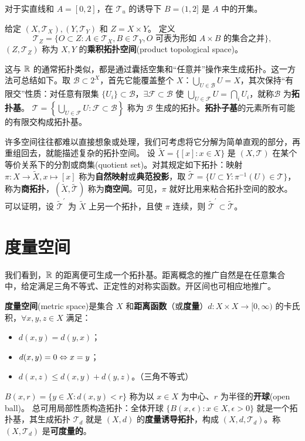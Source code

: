 \begin{eg}
    对于实直线和 $A=[0,2]$，在 $\mathscr T_u$ 的诱导下 $B=(1,2]$ 是 $A$ 中的开集。
\end{eg}

\begin{definition}
    给定 $(X,\mathscr T_X),(Y,\mathscr T_Y)$ 和 $Z=X \times Y$。
    定义
    \[\mathscr T_Z=\{O\subset Z:A\in\mathscr T_X,B\in\mathscr T_Y,\text{$O$ 可表为形如 $A\times B$ 的集合之并}\},\]
    $(Z,\mathscr T_Z)$ 称为 $X,Y$ 的\textbf{乘积拓扑空间}(product topological space)。
\end{definition}

这与 $\mathbb{R}$ 的通常拓扑类似，都是通过囊括空集和“任意并”操作来生成拓扑。这一方法可总结如下。取 $\mathscr{B} \subset 2^X$，首先它能覆盖整个 $X$：$\bigcup_{U\in\mathscr{B}}U=X$，其次保持“有限交”性质：对任意有限集 $\{U_i\}\subset\mathscr{B}$，$\exists\mathscr{F}\subset \mathscr{B}$ 使 $\bigcup_{U\in\mathscr{F}}U=\bigcap_{i} U_i$，就称$\mathscr{B}$ 为\textbf{拓扑基}。
$\mathscr{T}=\left\{\bigcup_{U\in\mathscr{F}}U:\mathscr{F}\subset\mathscr{B}\right\}$ 称为 $\mathscr{B}$ 生成的拓扑。\textbf{拓扑子基}的元素所有可能的有限交构成拓扑基。

许多空间往往都难以直接想象或处理，我们可考虑将它分解为简单直观的部分，再重组回去，就能描述复杂的拓扑空间。
设 $\tilde X=\{[x]:x\in X\}$ 是 $(X,\mathscr T)$ 在某个等价关系下的分割或商集(quotient set)。对其规定如下拓扑：映射 $\pi: X \to \tilde X,x\mapsto [x]$ 称为\textbf{自然映射}或\textbf{典范投影}，取 $\tilde{\mathscr T}=\{U \subset Y:\pi^{-1}(U)\in\mathscr T\}$，称为\textbf{商拓扑}，$(\tilde X,\tilde{\mathscr T})$ 称为\textbf{商空间}。可见，$\pi$ 就好比用来粘合拓扑空间的胶水。
可以证明，设 $\tilde{\mathscr T}^{\prime}$ 为 $\tilde X$ 上另一个拓扑，且使 $\pi$ 连续，则 $\tilde{\mathscr T}^{\prime} \subset \tilde{\mathscr T}$。

\section{度量空间}

我们看到，$\mathbb{R}$ 的距离便可生成一个拓扑基。距离概念的推广自然是在任意集合中，给定满足三角不等式、正定性的对称实函数。开区间也可相应地推广。

\begin{definition}
    \textbf{度量空间}(metric space)是集合 $X$ 和\textbf{距离函数}（或\textbf{度量}）$d: X \times X \to [0,\infty)$ 的卡氏积，$\forall x,y,z\in X$ 满足：
    \begin{itemize}
        \item $d(x,y)=d(y,x)$；
        \item $d(x,y) = 0\Leftrightarrow x=y$；
        \item $d(x,z) \leqslant d(x,y)+d(y,z)$。（三角不等式）
    \end{itemize}
    $B(x,r)=\{y \in X: d(x, y)<r\}$ 称为以 $x \in X$ 为中心、$r$ 为半径的\textbf{开球}(open ball)。
    总可用局部性质构造拓扑：全体开球 $\{B(x,\epsilon):x\in X,\epsilon >0\}$ 就是一个拓扑基，其生成拓扑 $\mathscr T_d$ 就是 $(X,d)$ 的\textbf{度量诱导拓扑}，构成 $(X,d,\mathscr T_d)$。称 $(X,\mathscr T_d)$ 是\textbf{可度量的}。
\end{definition}

